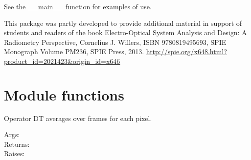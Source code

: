 \documentclass[a4paper,10pt,english]{sphinxmanual}
\begin{document}
See the \_\_main\_\_ function for examples of use.

This package was partly developed to provide additional material in support of students 
and readers of the book Electro-Optical System Analysis and Design: A Radiometry 
Perspective,  Cornelius J. Willers, ISBN 9780819495693, SPIE Monograph Volume
PM236, SPIE Press, 2013.  \href{http://spie.org/x648.html?product\_id=2021423\&origin\_id=x646}{http://spie.org/x648.html?product\_id=2021423\&origin\_id=x646}


\section{Module functions}
\label{ry3dnoise:module-functions}

\begin{fulllineitems}
\label{ry3dnoise:pyradi.ry3dnoise.oprDT}
Operator DT averages over frames for each pixel.
\begin{description}
\item[{Args:}] \leavevmode
{}

\item[{Returns:}] \leavevmode
{}

\item[{Raises:}] \leavevmode
{}

\end{description}

\end{fulllineitems}

\end{document}
